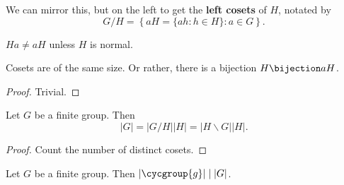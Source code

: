 \begin{df}
We can mirror this, but on the left to get the \textbf{left cosets} of
$H$, notated by
\[ G / H = \left\lbrace aH = \lbrace ah : h \in H \rbrace : a \in G
\right\rbrace. \]
\end{df}

\begin{rem}
$Ha \neq aH$ unless $H$ is normal.
\end{rem}

\begin{prop}
Cosets are of the same size. Or rather, there is a bijection $H
\bijection aH$.
\end{prop}

\begin{proof}
Trivial.
\end{proof}

\begin{thm}[Lagrange]
Let $G$ be a finite group. Then
\[ \lvert G \rvert = \lvert G / H \rvert \lvert H \rvert = \lvert H
\backslash G \rvert \lvert H \rvert. \]
\end{thm}

\begin{proof}
Count the number of distinct cosets.
\end{proof}

\begin{cor}
Let $G$ be a finite group. Then $\lvert \cycgroup{g} \rvert \mid \lvert
G \rvert$.
\end{cor}
